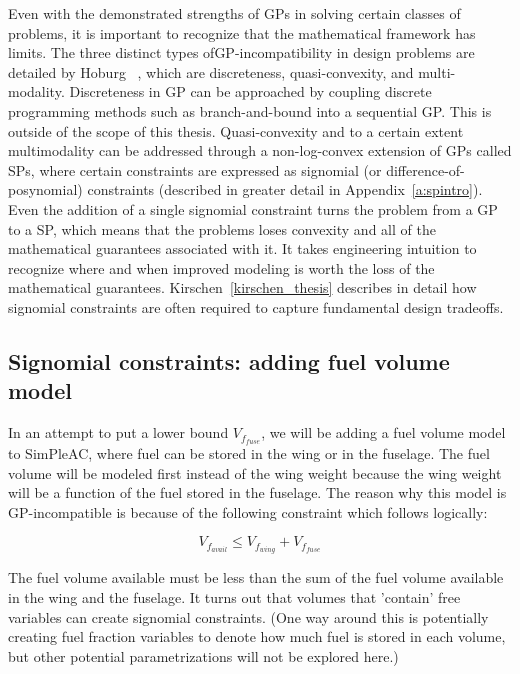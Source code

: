 Even with the demonstrated strengths of \gls{GP}s in solving certain classes of
problems, it is important to recognize that the mathematical framework has limits.
The three distinct types of\gls{GP}-incompatibility in design problems are detailed
by Hoburg~ \cite{hoburg_thesis}, which are discreteness,
quasi-convexity, and multi-modality. Discreteness in \gls{GP} can be approached
by coupling discrete programming methods such as branch-and-bound into a sequential
\gls{GP}. This is outside of the scope of this thesis.
Quasi-convexity and to a certain extent multimodality can
be addressed through a non-log-convex extension of \gls{GP}s called \gls{SP}s, where
certain constraints are expressed as signomial (or difference-of-posynomial) constraints
(described in greater detail in Appendix~\ref{a:spintro}).
Even the addition of a single
signomial constraint turns the problem from a \gls{GP} to a \gls{SP}, which means
that the problems loses convexity and all of the mathematical guarantees associated with it. 
It takes engineering intuition to recognize where and when improved modeling is worth
the loss of the mathematical guarantees. Kirschen~\ref{kirschen_thesis} describes in detail how
signomial constraints are often required to capture fundamental design tradeoffs.

\subsection{Signomial constraints: adding fuel volume model}
\label{s:fuel}

In an attempt to put a lower bound $V_{f_{fuse}}$, we will
be adding a fuel volume model to SimPleAC, where fuel can be stored in the wing or
in the fuselage. The fuel volume will be modeled first instead of the wing
weight because the wing weight will be a function of the fuel stored in the fuselage.
The reason why this model is \gls{GP}-incompatible is because of the
following constraint which follows logically:

\begin{equation}
	V_{f_{avail}} \leq V_{f_{wing}} + V_{f_{fuse}}
	\label{vfavail}
\end{equation}

The fuel volume available must be less than the sum of the fuel volume available in the
wing and the fuselage. It turns out that volumes that 'contain' free variables
can create signomial constraints. (One way around this is potentially creating fuel
fraction variables to denote how much fuel is stored in each volume, but
other potential parametrizations will not be explored here.)

